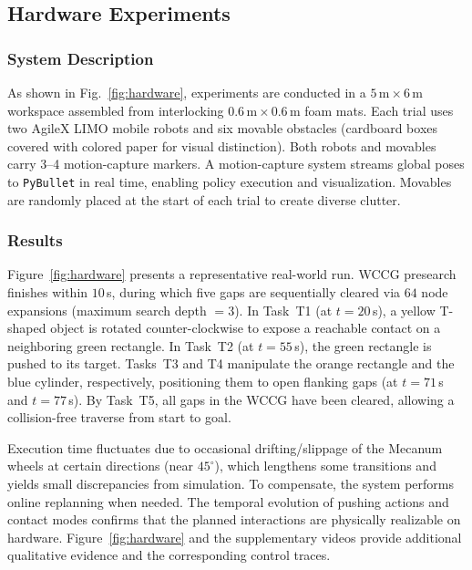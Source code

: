 \subsection{Hardware Experiments}\label{subsec:hardware}

\subsubsection{System Description}\label{subsec:exp-description}
As shown in Fig.~\ref{fig:hardware},
experiments are conducted in a $5\,\mathrm{m}\times6\,\mathrm{m}$ workspace assembled from interlocking $0.6\,\mathrm{m}\times0.6\,\mathrm{m}$ foam mats.
Each trial uses two AgileX LIMO mobile robots and six movable obstacles (cardboard boxes covered with colored paper for visual distinction).
Both robots and movables carry 3--4 motion-capture markers.
A motion-capture system streams global poses to \texttt{PyBullet} in real time, enabling policy execution and visualization.
Movables are randomly placed at the start of each trial to create diverse clutter.

\subsubsection{Results}\label{subsec:exp-results}
Figure~\ref{fig:hardware} presents a representative real-world run.
WCCG presearch finishes within $10$\,s, during which five gaps are sequentially cleared via $64$ node expansions (maximum search depth $=3$).
In Task~T1 (at $t{=}20$\,s), a yellow T-shaped object is rotated counter-clockwise to expose a reachable contact on a neighboring green rectangle.
In Task~T2 (at $t{=}55$\,s), the green rectangle is pushed to its target.
Tasks~T3 and T4 manipulate the orange rectangle and the blue cylinder, respectively, positioning them to open flanking gaps (at $t{=}71$\,s and $t{=}77$\,s).
By Task~T5, all gaps in the WCCG have been cleared, allowing a collision-free traverse from start to goal.

Execution time fluctuates due to occasional drifting/slippage of the Mecanum wheels at certain directions (near $45^\circ$), which lengthens some transitions and yields small discrepancies from simulation.
To compensate, the system performs online replanning when needed.
The temporal evolution of pushing actions and contact modes confirms that the planned interactions are physically realizable on hardware.
Figure~\ref{fig:hardware} and the supplementary videos provide additional qualitative evidence and the corresponding control traces.


